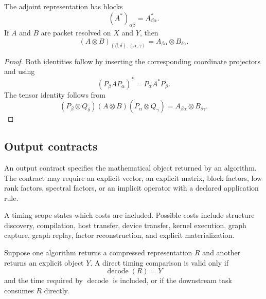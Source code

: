 \begin{corollary}\label{main:corollary:001}\label{cor:adjoint_tensor}
The adjoint representation has blocks
\[
(A^*)_{\alpha\beta}=A_{\beta\alpha}^*.
\]
If \(A\) and \(B\) are packet resolved on \(X\) and \(Y\), then
\[
(A\otimes B)_{(\beta,\delta),(\alpha,\gamma)}
=
A_{\beta\alpha}\otimes B_{\delta\gamma}.
\]
\end{corollary}

\begin{proof}\label{main:proof:003}
Both identities follow by inserting the corresponding coordinate projectors and using
\[
(P_\beta AP_\alpha)^*=P_\alpha A^*P_\beta.
\]
The tensor identity follows from
\[
(P_\beta\otimes Q_\delta)
(A\otimes B)
(P_\alpha\otimes Q_\gamma)
=
A_{\beta\alpha}\otimes B_{\delta\gamma}.
\]
\label{main:proof:003:end}\end{proof}

\subsection{Output contracts}\label{main:subsection:002}

\begin{definition}\label{main:definition:004}\label{def:output_contract}
An output contract specifies the mathematical object returned by an algorithm. The contract may require an explicit vector, an explicit matrix, block factors, low rank factors, spectral factors, or an implicit operator with a declared application rule.
\end{definition}

\begin{definition}\label{main:definition:005}\label{def:timing_scope}
A timing scope states which costs are included. Possible costs include structure discovery, compilation, host transfer, device transfer, kernel execution, graph capture, graph replay, factor reconstruction, and explicit materialization.
\end{definition}

\begin{proposition}\label{main:proposition:001}\label{prop:contract_conversion}
Suppose one algorithm returns a compressed representation \(R\) and another returns an explicit object \(Y\). A direct timing comparison is valid only if
\[
\operatorname{decode}(R)=Y
\]
and the time required by \(\operatorname{decode}\) is included, or if the downstream task consumes \(R\) directly.
\end{proposition}

